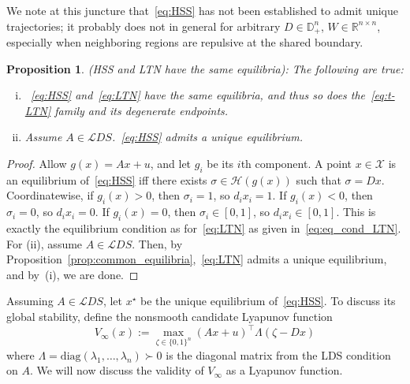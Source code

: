 \documentclass[letterpaper, conference]{ieeeconf}
\newcommand{\R}{\mathbb R}
\newcommand{\X}{\mathcal X}
\newtheorem{proposition}[theorem]{Proposition}
\newcommand{\longthmtitle}[1]{\mbox{}{\textit{(#1):}}}
\newcommand{\1}{\mathbf{1}}
\newcommand{\mc}{\mathcal}
\newcommand{\diag}{\mathrm{diag}}
\begin{document}
We note at this juncture that~\eqref{eq:HSS} has not been established to admit unique trajectories; it probably does not in general for arbitrary \(D \in \mathbb D_+^n\), \(W\in \R^{n\times n}\), especially when neighboring regions are repulsive at the shared boundary.

\begin{proposition}\longthmtitle{HSS and LTN have the same equilibria}
\label{prop:HSS_equilibria}
The following are true:
\begin{enumerate}[(i)]
    \item~\eqref{eq:HSS} and~\eqref{eq:LTN} have the same equilibria, and thus so does the~\eqref{eq:t-LTN} family and its degenerate endpoints.
    \item Assume \(A \in \mc LDS\).~\eqref{eq:HSS} admits a unique equilibrium.
\end{enumerate}
\end{proposition}

\begin{proof}
Allow \(g(x) = Ax + u\), and let \(g_i\) be its \(i\)th component.
A point \(x\in\X\) is an equilibrium of~\eqref{eq:HSS} iff there exists \(\sigma\in\mc H(g(x))\) such that \(\sigma=Dx\).
Coordinatewise, if \(g_i(x)>0\), then \(\sigma_i=1\), so \(d_i x_i=1\). 
If \(g_i(x)<0\), then \(\sigma_i=0\), so \(d_ix_i=0\).
If \(g_i(x)=0\), then \(\sigma_i\in[0,1]\), so \(d_i x_i\in[0,1]\). 
This is exactly the equilibrium condition as for~\eqref{eq:LTN} as given in~\eqref{eq:eq_cond_LTN}.
For (ii), assume \(A\in \mc LDS\). 
Then, by Proposition~\ref{prop:common_equilibria},~\eqref{eq:LTN} admits a unique equilibrium, and by~(i), we are done.
\end{proof}

Assuming  \(A \in \mc LDS\), let \(x^\star\) be the unique equilibrium of~\eqref{eq:HSS}.
To discuss its global stability, define the  nonsmooth candidate Lyapunov function
\begin{equation}\label{eq:Vslow_def}
V_\infty(x):= \max_{\zeta \in \{0, 1\}^n}
(Ax + u)^\top \Lambda (\zeta-Dx)
\end{equation}
where \(\Lambda=\diag(\lambda_1,\dots,\lambda_n)\succ0\) is the diagonal matrix from the LDS condition on \(A\).
We will now discuss the validity of \(V_\infty\) as a Lyapunov function.
\end{document}
